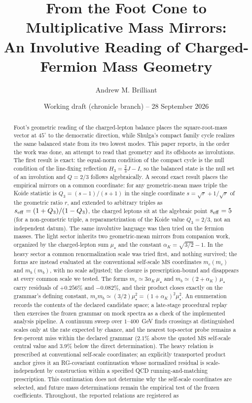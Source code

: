 \documentclass[aps,twocolumn,superscriptaddress,nofootinbib,floatfix]{revtex4-2}
\newcommand{\MSbar}{\overline{\mathrm{MS}}}
\newcommand{\mstar}{\mu_\star}
\newcommand{\alphaK}{\alpha_K}
\begin{document}
\title{From the Foot Cone to Multiplicative Mass Mirrors:\\
An Involutive Reading of Charged-Fermion Mass Geometry}

\author{Andrew M. Brilliant}
\date{Working draft (chronicle branch) -- 28 September 2026}

\begin{abstract}
Foot's geometric reading of the charged-lepton balance places the square-root-mass vector at $45^\circ$ to the democratic direction, while Shulga's compact family cycle realizes the same balanced state from its two lowest modes. This paper reports, in the order the work was done, an attempt to read that geometry and its offshoots as involutions. The first result is exact: the equal-norm condition of the compact cycle is the null condition of the line-fixing reflection $H_3=\frac23J-I$, so the balanced state is the null set of an involution and $Q=2/3$ follows algebraically. A second exact result places the empirical mirrors on a common coordinate: for any geometric-mean mass triple the Koide statistic is $Q_3=(s-1)/(s+1)$ in the single coordinate $s=\sqrt{r}+1/\sqrt{r}$ of the geometric ratio $r$, and extended to arbitrary triples as $s_{\rm eff}=(1+Q_3)/(1-Q_3)$, the charged leptons sit at the algebraic point $s_{\rm eff}=5$ (for a non-geometric triple, a reparametrization of the Koide value $Q_3=2/3$, not an independent datum). The same involutive language was then tried on the fermion masses. The light sector inherits two geometric-mean mirrors from companion work, organized by the charged-lepton sum $\mstar$ and the constant $\alphaK=\sqrt{3/2}-1$. In the heavy sector a common renormalization scale was tried first, and nothing survived; the forms are instead evaluated at the conventional self-scale $\MSbar$ coordinates $m_c(m_c)$ and $m_b(m_b)$, with no scale adjusted; the closure is prescription-bound and disappears at every common scale we tested. The forms $m_c\simeq3\alphaK\,\mstar$ and $m_b\simeq(2+\alphaK)\,\mstar$ carry residuals of $+0.256\%$ and $-0.082\%$, and their product closes exactly on the grammar's defining constant, $m_cm_b\simeq(3/2)\mstar^2=(1+\alphaK)^2\mstar^2$. An enumeration records the contents of the declared candidate space; a late-stage procedural replay then exercises the frozen grammar on mock spectra as a check of the implemented analysis pipeline. A continuum sweep over $1$--$400$~GeV finds crossings at distinguished scales only at the rate expected by chance, and the nearest top-sector probe remains a few-percent miss within the declared grammar ($2.1\%$ above the quoted $\MSbar$ self-scale central value and $3.9\%$ below the direct determination). The heavy relation is prescribed at conventional self-scale coordinates; an explicitly transported product anchor gives it an RG-covariant continuation whose normalized residual is scale-independent by construction within a specified QCD running-and-matching prescription. This continuation does not determine why the self-scale coordinates are selected, and future mass determinations remain the empirical test of the frozen coefficients. Throughout, the reported relations are registered as 
\end{abstract}
\end{document}
